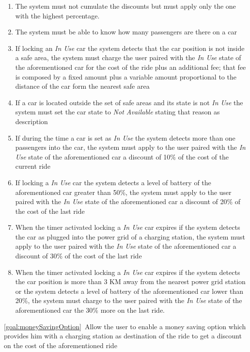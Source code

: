 \begin{description}
\begin{enumerate}[resume*]
  			    \item The system must not cumulate the discounts but must apply only the one with
  			    the highest percentage.
  			    \item The system must be able to know how many passengers are there on a car	
  				\item If locking an \emph{In Use} car the system detects that the car position is not
  				inside a safe area, the system must charge the user paired with the \emph{In Use}
  				state of the aforementioned car for the cost of the ride plus an additional fee; that fee
  				is composed by a fixed amount plus a variable amount proportional to the distance of
  				the car form the nearest safe area
  				\item If a car is located outside the set of safe areas and its state is not \emph{In
  				Use} the system must set the car state to \emph{Not Available} stating that reason
  				as description
  				\item If during the time a car is set as \emph{In Use} the system detects more than
  				one passengers into the car, the system must apply to the user paired with the
  				\emph{In Use} state of the aforementioned car a discount of 10\% of the cost of
  				the current ride
  				\item If locking  a \emph{In Use} car the system detects a level of battery of the
  				aforementioned car greater than 50\%, the system must apply to the user paired with
  				the \emph{In Use} state of the aforementioned car a discount of 20\% of the cost
  				of the last ride
  				\item When the timer activated locking a \emph{In Use} car expires if the system
  				detects the car as plugged into the power grid of a charging station, the system must
  				apply to the user paired with the \emph{In Use} state of the aforementioned car a
  				discount of 30\% of the cost of the last ride
  				\item When the timer activated locking a \emph{In Use} car expires if the system
  				detects the car position is more than 3 KM away from the nearest power grid station
  				or the system detects a level of battery of the aforementioned car lower than 20\%, 
  				the system must charge to the user paired with the \emph{In Use} state of the 
  				aforementioned car the 30\% more on the last ride. 
   			\end{enumerate}
  		\item \ref{goal:moneySavingOption}\ Allow the user to enable a money saving option which provides him with a charging station as destination of the ride to get a discount on the cost of the aforementioned ride

\end{description}
